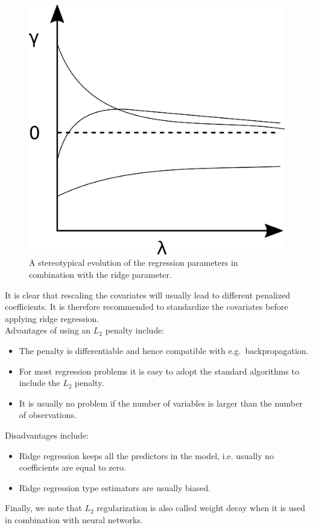 \begin{figure}[!htb]
\centering
\includegraphics[scale=0.75]{VectorGraphics/ridgeTrace.png}
\caption{\label{fig:RidgeTrace}A stereotypical evolution of the regression parameters in combination with the ridge parameter.}
\end{figure}

It is clear that rescaling the covariates will usually lead to different penalized coefficients. It is therefore recommended to standardize the covariates before applying ridge regression.\\

Advantages of using an $L_2$ penalty include:
\begin{itemize}
\item The penalty is differentiable and hence compatible with e.g.\ backpropagation.
\item For most regression problems it is easy to adopt the standard algorithms to include the $L_2$ penalty.
\item It is usually no problem if the number of variables is larger than the number of observations.
\end{itemize}


Disadvantages include:
\begin{itemize}
\item Ridge regression keeps all the predictors in the model, i.e. usually no coefficients are equal to zero.
\item Ridge regression type estimators are usually biased.
\end{itemize}
Finally, we note that $L_2$ regularization is also called weight decay when it is used in combination with neural networks. 

